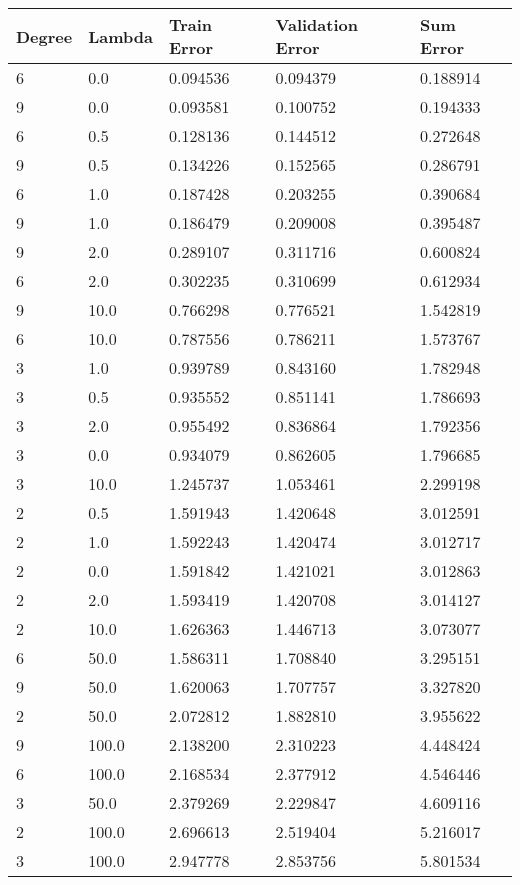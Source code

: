 \def\arraystretch{1.25}
\begin{center}
\begin{tabular}{l l l l l}
\hline
\hline
\textbf{Degree} & \textbf{Lambda} & \textbf{Train Error} & \textbf{Validation Error} & \textbf{Sum Error}\\
\hline
\hline
6 & 0.0 & 0.094536 & 0.094379 & 0.188914 \\
9 & 0.0 & 0.093581 & 0.100752 & 0.194333 \\
6 & 0.5 & 0.128136 & 0.144512 & 0.272648 \\
9 & 0.5 & 0.134226 & 0.152565 & 0.286791 \\
6 & 1.0 & 0.187428 & 0.203255 & 0.390684 \\
9 & 1.0 & 0.186479 & 0.209008 & 0.395487 \\
9 & 2.0 & 0.289107 & 0.311716 & 0.600824 \\
6 & 2.0 & 0.302235 & 0.310699 & 0.612934 \\
9 & 10.0 & 0.766298 & 0.776521 & 1.542819 \\
6 & 10.0 & 0.787556 & 0.786211 & 1.573767 \\
3 & 1.0 & 0.939789 & 0.843160 & 1.782948 \\
3 & 0.5 & 0.935552 & 0.851141 & 1.786693 \\
3 & 2.0 & 0.955492 & 0.836864 & 1.792356 \\
3 & 0.0 & 0.934079 & 0.862605 & 1.796685 \\
3 & 10.0 & 1.245737 & 1.053461 & 2.299198 \\
2 & 0.5 & 1.591943 & 1.420648 & 3.012591 \\
2 & 1.0 & 1.592243 & 1.420474 & 3.012717 \\
2 & 0.0 & 1.591842 & 1.421021 & 3.012863 \\
2 & 2.0 & 1.593419 & 1.420708 & 3.014127 \\
2 & 10.0 & 1.626363 & 1.446713 & 3.073077 \\
6 & 50.0 & 1.586311 & 1.708840 & 3.295151 \\
9 & 50.0 & 1.620063 & 1.707757 & 3.327820 \\
2 & 50.0 & 2.072812 & 1.882810 & 3.955622 \\
9 & 100.0 & 2.138200 & 2.310223 & 4.448424 \\
6 & 100.0 & 2.168534 & 2.377912 & 4.546446 \\
3 & 50.0 & 2.379269 & 2.229847 & 4.609116 \\
2 & 100.0 & 2.696613 & 2.519404 & 5.216017 \\
3 & 100.0 & 2.947778 & 2.853756 & 5.801534 \\
\hline
\end{tabular}
\setcounter{table}{1}
\end{center}